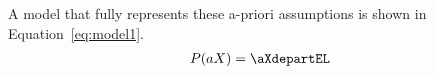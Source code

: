 A model that fully represents these a-priori assumptions is shown in Equation~\ref{eq:model1}.
\begin{align}
    P(aX) = \aXdepartEL
\end{align}
